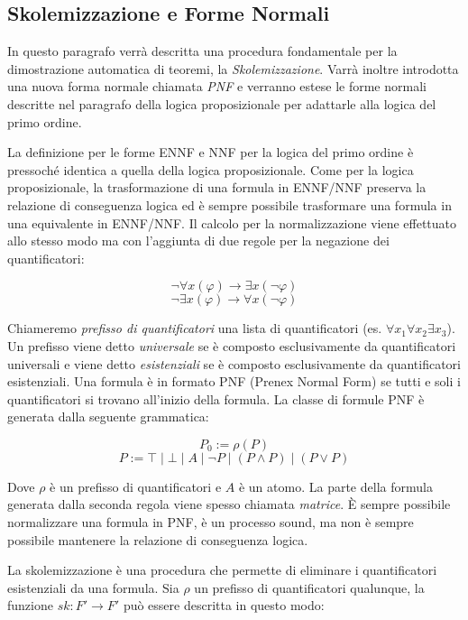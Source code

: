 \documentclass[./main.tex]{subfiles}
\begin{document}

\subsection{Skolemizzazione e Forme Normali}
In questo paragrafo verrà descritta una procedura fondamentale per la dimostrazione automatica di teoremi, la \textit{Skolemizzazione}. Varrà inoltre introdotta
una nuova forma normale chiamata \textit{PNF} e verranno
estese le forme normali descritte nel paragrafo della logica proposizionale per adattarle alla logica del primo ordine.


La definizione per le forme ENNF e NNF per la logica del primo ordine è pressoché identica a quella della logica proposizionale.
Come per la logica proposizionale, la trasformazione di una formula in ENNF/NNF preserva la relazione di conseguenza logica ed è sempre
possibile trasformare una formula in una equivalente in ENNF/NNF. 
Il calcolo per la normalizzazione viene effettuato allo stesso modo ma con l'aggiunta di due regole per la negazione dei quantificatori:

$$ \lnot \forall x (\varphi) \rightarrow \exists x (\lnot \varphi) $$
$$ \lnot \exists x (\varphi) \rightarrow \forall x (\lnot \varphi) $$


Chiameremo \textit{prefisso di quantificatori} una lista di quantificatori (es. $\forall x_1 \forall x_2 \exists x_3$). 
Un prefisso viene detto \textit{universale} se è composto esclusivamente da quantificatori universali e viene detto \textit{esistenziali} 
se è composto esclusivamente da quantificatori esistenziali. Una formula è in formato PNF (Prenex Normal Form) se tutti e soli 
i quantificatori si trovano all'inizio della formula. La classe di formule PNF è generata dalla seguente grammatica:

$$ P_0 := \rho(P) $$
$$ P := \top \mid \bot \mid A \mid \lnot P \mid (P \land P) \mid (P \lor P) $$

Dove $\rho$ è un prefisso di quantificatori e $A$ è un atomo.
La parte della formula generata dalla seconda regola viene spesso chiamata \textit{matrice}.
È sempre possibile normalizzare una formula in PNF, è un processo sound, ma non è sempre possibile mantenere la relazione di conseguenza logica.


La skolemizzazione è una procedura che permette di eliminare i quantificatori esistenziali da una formula. 
Sia $\rho$ un prefisso di quantificatori qualunque, la funzione $sk : F' \rightarrow F'$ può essere descritta in questo modo:
\end{document}
